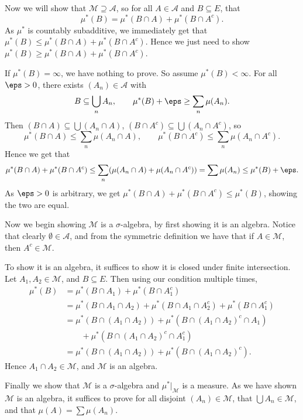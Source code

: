 \documentclass[12pt]{article}
\begin{document}
\begin{proofbox}
	Now we will show that $\mathcal{M} \supseteq \mathcal{A}$, so for all $A \in \mathcal{A}$ and $B \subseteq E$, that
	\[
	\mu^{\ast}(B) = \mu^{\ast}(B \cap A) + \mu^{\ast}(B \cap A^{c}).
	\]
	As $\mu^{\ast}$ is countably subadditive, we immediately get that $\mu^{\ast}(B) \leq \mu^{\ast}(B \cap A) + \mu^{\ast}(B \cap A^{c})$. Hence we just need to show $\mu^{\ast}(B) \ge \mu^{\ast}(B \cap A) + \mu^{\ast}(B \cap A^{c})$.

	If $\mu^{\ast}(B) = \infty$, we have nothing to prove. So assume $\mu^{\ast}(B) < \infty$. For all $\eps > 0$, there exists $(A_n) \in \mathcal{A}$ with
	\[
	B \subseteq \bigcup_n A_n, \qquad \mu^{\ast}(B) + \eps \geq \sum_n \mu(A_n).
	\]
	Then $(B \cap A) \subseteq \bigcup (A_n \cap A)$, $(B \cap A^{c}) \subseteq \bigcup (A_n \cap A^{c})$, so
	\[
	\mu^{\ast}(B \cap A) \leq \sum_n \mu (A_n \cap A), \qquad \mu^{\ast}(B \cap A^{c}) \leq \sum_n \mu(A_n \cap A^{c}).
	\]
	Hence we get that
	\[
	\mu^{\ast}(B \cap A) + \mu^{\ast}(B \cap A^{c}) \leq \sum_n(\mu(A_n \cap A) + \mu(A_n \cap A^{c})) = \sum \mu(A_n) \leq \mu^{\ast}(B) + \eps.
	\]
	As $\eps > 0$ is arbitrary, we get $\mu^{\ast}(B \cap A) + \mu^{\ast}(B \cap A^{c}) \leq \mu^{\ast}(B)$, showing the two are equal.

	Now we begin showing $\mathcal{M}$ is a $\sigma$-algebra, by first showing it is an algebra. Notice that clearly $\emptyset \in \mathcal{A}$, and from the symmetric definition we have that if $A \in \mathcal{M}$, then $A^{c} \in \mathcal{M}$.

	To show it is an algebra, it suffices to show it is closed under finite intersection. Let $A_1, A_2 \in \mathcal{M}$, and $B \subseteq E$. Then using our condition multiple times,
	\begin{align*}
		\mu^{\ast}(B) &= \mu^{\ast}(B \cap A_1) + \mu^{\ast}(B \cap A_1^{c}) \\
			      &= \mu^{\ast}(B \cap A_1 \cap A_2) + \mu^{\ast}(B \cap A_1 \cap A_2^{c}) + \mu^{\ast}(B \cap A_1^{c}) \\
			      &= \mu^{\ast}(B \cap (A_1 \cap A_2)) + \mu^{\ast}(B \cap (A_1 \cap A_2)^{c} \cap A_1) \\
			      &\qquad+ \mu^{\ast}(B \cap (A_1 \cap A_2)^{c} \cap A_1^{c}) \\
			      &= \mu^{\ast}(B \cap (A_1 \cap A_2)) + \mu^{\ast}(B \cap (A_1 \cap A_2)^{c}).
	\end{align*}
	Hence $A_1 \cap A_2 \in \mathcal{M}$, and $\mathcal{M}$ is an algebra.

	Finally we show that $\mathcal{M}$ is a $\sigma$-algebra and $\mu^{\ast}|_\mathcal{M}$ is a measure. As we have shown $\mathcal{M}$ is an algebra, it suffices to prove for all disjoint $(A_n) \in \mathcal{M}$, that $\bigcup A_n \in \mathcal{M}$, and that $\mu(A) = \sum \mu(A_n)$.


\end{proofbox}
\end{document}
